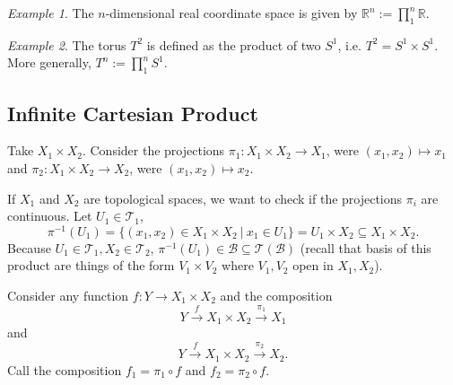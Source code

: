 \documentclass[article,11pt, reqno]{article}
\newtheorem*{lemma}{Lemma}
\theoremstyle{remark}
\newtheorem*{example}{Example}
\newcommand{\mb}{\mathbb}
\newcommand{\mc}{\mathcal}
\newcommand{\<}{\langle}
\renewcommand{\>}{\rangle}
\begin{document}
\begin{example}
    The $n$-dimensional real coordinate space is given by $\mb R^n:=\prod_1^n\mb R$.
\end{example}
\begin{example}
    The torus $T^2$ is defined as the product of two $S^1$, i.e. $T^2 = S^1\times S^1$. More generally, $T^n:=\prod_1^n S^1$.
\end{example}

\subsection*{Infinite Cartesian Product}
Take $X_1\times X_2$. Consider the projections $\pi_1: X_1\times X_2\rightarrow X_1$, were $(x_1, x_2)\mapsto x_1$ and $\pi_2: X_1\times X_2\rightarrow X_2$, were $(x_1, x_2)\mapsto x_2$.

If $X_1$ and $X_2$ are topological spaces, we want to check if the projections $\pi_i$ are continuous. Let $U_1\in\mc T_1$, 
$$\pi^{-1}(U_1)=\{(x_1, x_2)\in X_1\times X_2 \ | \ x_1\in U_1\} = U_1\times X_2\subseteq X_1\times X_2.$$
Because $U_1\in\mc T_1, X_2\in\mc T_2$, $\pi^{-1}(U_1)\in\mc B\subseteq \mc T(\mc B)$ (recall that basis of this product are things of the form $V_1\times V_2$ where $V_1, V_2$ open in $X_1, X_2$).\\


Consider any function $f: Y\rightarrow X_1\times X_2$ and the composition
$$Y\xrightarrow{f} X_1\times X_2\xrightarrow{\pi_1} X_1$$ and
$$Y\xrightarrow{f} X_1\times X_2\xrightarrow{\pi_2} X_2.$$
Call the composition $f_1=\pi_1\circ f$ and $f_2=\pi_2\circ f$.
\end{document}
